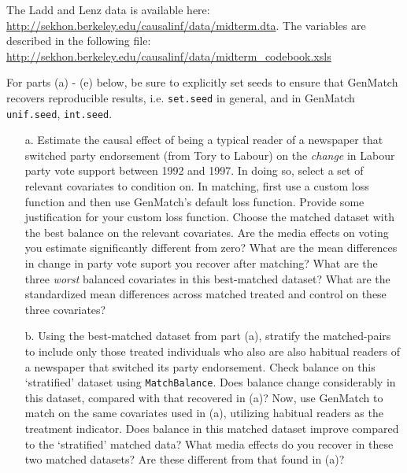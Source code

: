 \documentclass{article}
\begin{document}
\noindent The Ladd and Lenz data is available here:
\url{http://sekhon.berkeley.edu/causalinf/data/midterm.dta}.
The variables are described in the following file:
\url{http://sekhon.berkeley.edu/causalinf/data/midterm_codebook.xsls}


\vspace{1em}
\noindent For parts (a) - (e) below, be sure to explicitly set seeds
to ensure that GenMatch recovers reproducible results,
i.e. \texttt{set.seed} in general, and in GenMatch \texttt{unif.seed}, \texttt{int.seed}.

\begin{itemize}
\item[a.]  Estimate the causal effect of being a typical reader of a
  newspaper that switched party endorsement (from Tory to Labour) on
  the {\em change} in Labour party vote support between 1992 and 1997.
  In doing so, select a set of relevant covariates to condition on.
  In matching, first use a custom loss function and then use
  GenMatch’s default loss function. Provide some justification for
  your custom loss function. Choose the matched dataset with the best
  balance on the relevant covariates.  Are the media effects on voting
  you estimate significantly different from zero? What are the mean
  differences in change in party vote suport you recover after
  matching?  What are
  the three {\em worst} balanced covariates in this best-matched
  dataset?  What are the standardized mean differences across matched
  treated and control on these three covariates?


\item[b.] Using the best-matched dataset from part (a), stratify the
  matched-pairs to include only those treated individuals who also are
  also habitual readers of a newspaper that switched its party
  endorsement.  Check balance on this `stratified' dataset using
  \texttt{MatchBalance}.  Does balance change considerably in this
  dataset, compared with that recovered in (a)?  Now, use GenMatch to
  match on the same covariates used in (a), utilizing habitual readers
  as the treatment indicator.  Does balance in this matched dataset
  improve compared to the `stratified' matched data?  What media
  effects do you recover in these two matched datasets?  Are these
  different from that found in (a)?


\end{itemize}
\end{document}

